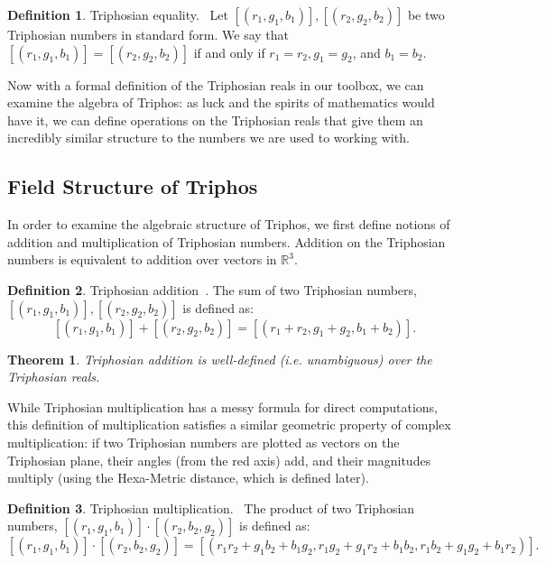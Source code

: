\documentclass[11pt]{article}
\theoremstyle{definition}
\newtheorem{definition}{Definition}
\theoremstyle{plain}
\newtheorem{theorem}{Theorem}
\theoremstyle{remark}
\begin{document}
	\begin{definition}{Triphosian equality.~\cite{egging}}
		Let \([(r_1,g_1,b_1)], [(r_2,g_2,b_2)]\) be two Triphosian numbers in
		standard form. We say that \([(r_1,g_1,b_1)] = [(r_2,g_2,b_2)]\) if and
		only if \(r_1 = r_2, g_1 = g_2\), and \(b_1 = b_2\).
	\end{definition}

	Now with a formal definition of the Triphosian reals in our toolbox, we can
	examine the algebra of Triphos: as luck and the spirits of mathematics
	would have it, we can define operations on the Triphosian reals that give
	them an incredibly similar structure to the numbers we are used to working
	with.

	\subsection{Field Structure of Triphos}

	In order to examine the algebraic structure of Triphos, we first define
	notions of addition and multiplication of Triphosian numbers. Addition on
	the Triphosian numbers is equivalent to addition over vectors in
	\(\mathbb{R}^3\).

	\begin{definition}{Triphosian addition~\cite{egging}.}
		The sum of two Triphosian numbers, \([(r_1, g_1, b_1)], [(r_2, g_2,
		b_2)]\) is defined as:
		\[[(r_1, g_1, b_1)] + [(r_2, g_2, b_2)] = [(r_1 + r_2, g_1 + g_2, b_1 +
		b_2)].\]
	\end{definition}

	\begin{theorem}
		Triphosian addition is well-defined (i.e. unambiguous) over the
		Triphosian reals.~\cite{egging}
	\end{theorem}

	While Triphosian multiplication has a messy formula for direct
	computations, this definition of multiplication satisfies a similar
	geometric property of complex multiplication: if two Triphosian numbers are
	plotted as vectors on the Triphosian plane, their angles (from the red
	axis) add, and their magnitudes multiply (using the Hexa-Metric distance,
	which is defined later).

	\begin{definition}{Triphosian multiplication.~\cite{egging}}
		The product of two Triphosian numbers, \([(r_1, g_1, b_1)] \cdot [(r_2,
		b_2, g_2)]\) is defined as:
		\[[(r_1, g_1, b_1)] \cdot [(r_2, b_2, g_2)] = [(r_1r_2 + g_1b_2 +
		b_1g_2, r_1g_2 + g_1r_2 + b_1b_2, r_1b_2 + g_1g_2 + b_1r_2)].\]
	\end{definition}
\end{document}
